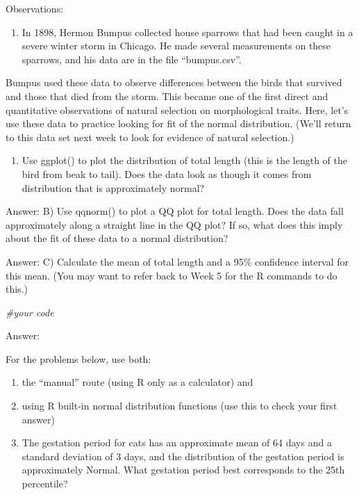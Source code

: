 \documentclass[
]{article}
\newenvironment{Shaded}{\begin{snugshade}}{\end{snugshade}}
\newcommand{\CommentTok}[1]{\textcolor[rgb]{0.56,0.35,0.01}{\textit{#1}}}
\providecommand{\tightlist}{%
  \setlength{\itemsep}{0pt}\setlength{\parskip}{0pt}}
\begin{document}
Observations:

\begin{enumerate}
\def\labelenumi{\arabic{enumi}.}
\setcounter{enumi}{2}
\tightlist
\item
  In 1898, Hermon Bumpus collected house sparrows that had been caught
  in a severe winter storm in Chicago. He made several measurements on
  these sparrows, and his data are in the file ``bumpus.csv''.
\end{enumerate}

Bumpus used these data to observe differences between the birds that
survived and those that died from the storm. This became one of the
first direct and quantitative observations of natural selection on
morphological traits. Here, let's use these data to practice looking for
fit of the normal distribution. (We'll return to this data set next week
to look for evidence of natural selection.)

\begin{enumerate}
\def\labelenumi{\Alph{enumi})}
\tightlist
\item
  Use ggplot() to plot the distribution of total length (this is the
  length of the bird from beak to tail). Does the data look as though it
  comes from distribution that is approximately normal?
\end{enumerate}

Answer: B) Use qqnorm() to plot a QQ plot for total length. Does the
data fall approximately along a straight line in the QQ plot? If so,
what does this imply about the fit of these data to a normal
distribution?

Answer: C) Calculate the mean of total length and a 95\% confidence
interval for this mean. (You may want to refer back to Week 5 for the R
commands to do this.)

\begin{Shaded}
\begin{Highlighting}[]
\CommentTok{\#your code}
\end{Highlighting}
\end{Shaded}

Answer:

For the problems below, use both:

\begin{enumerate}
\def\labelenumi{\arabic{enumi}.}
\item
  the ``manual'' route (using R only as a calculator) and
\item
  using R built-in normal distribution functions (use this to check your
  first answer)
\item
  The gestation period for cats has an approximate mean of 64 days and a
  standard deviation of 3 days, and the distribution of the gestation
  period is approximately Normal. What gestation period best corresponds
  to the 25th percentile?
\end{enumerate}
\end{document}
